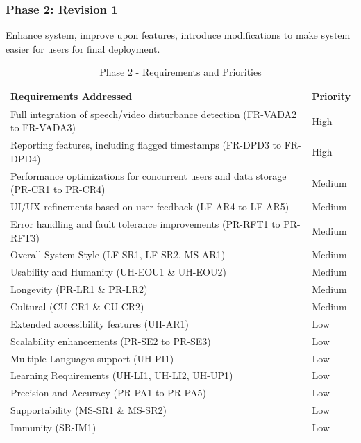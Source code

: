 \documentclass[12pt]{article}
\begin{document}
\newpage

\subsubsection*{Phase 2: Revision 1}

\hspace{2em}Enhance system, improve upon features, introduce modifications to make system easier for users for final deployment.

\begin{table}[H]
  \caption{Phase 2 - Requirements and Priorities}
  \label{tab:phase2}
  \begin{tabularx}{\textwidth}{|p{10cm}|X|}
  \hline
  \textbf{Requirements Addressed} & \textbf{Priority} \\
  \hline
  Full integration of speech/video disturbance detection (FR-VADA2 to FR-VADA3) & High \\
  \hline
  Reporting features, including flagged timestamps (FR-DPD3 to FR-DPD4) & High \\
  \hline
  Performance optimizations for concurrent users and data storage (PR-CR1 to PR-CR4) & Medium \\
  \hline
  UI/UX refinements based on user feedback (LF-AR4 to LF-AR5) & Medium \\
  \hline
  Error handling and fault tolerance improvements (PR-RFT1 to PR-RFT3) & Medium \\
  \hline
  Overall System Style (LF-SR1, LF-SR2, MS-AR1) & Medium \\
  \hline
  Usability and Humanity (UH-EOU1 \& UH-EOU2) & Medium \\
  \hline
  Longevity (PR-LR1 \& PR-LR2) & Medium \\
  \hline
  Cultural (CU-CR1 \& CU-CR2) & Medium \\
  \hline
  Extended accessibility features (UH-AR1) & Low \\
  \hline
  Scalability enhancements (PR-SE2 to PR-SE3) & Low \\
  \hline
  Multiple Languages support (UH-PI1) & Low \\
  \hline
  Learning Requirements (UH-LI1, UH-LI2, UH-UP1) & Low \\
  \hline
  Precision and Accuracy (PR-PA1 to PR-PA5) & Low \\
  \hline
  Supportability (MS-SR1 \& MS-SR2) & Low \\
  \hline
  Immunity (SR-IM1) & Low \\
  \hline
  \end{tabularx}
\end{table}
\end{document}
